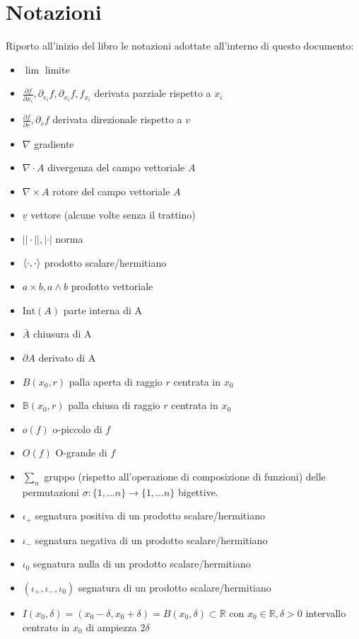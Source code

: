 \documentclass[openany, italian]{book}
\begin{document}
	\chapter*{Notazioni}
	Riporto all'inizio del libro le notazioni adottate all'interno di questo documento:
	\begin{itemize}[label=\hspace{-0.5em}]
		\item $\lim$ limite		
		\item $\frac{\partial f}{\partial x_i}, \partial_{e_i} f, \partial_{x_i} f, f_{x_i}$ derivata parziale rispetto a $x_i$
		\item $\frac{\partial f}{\partial v}, \partial_v f$ derivata direzionale rispetto a $v$
		\item $\nabla$ gradiente
		\item $\nabla \cdot A$ divergenza del campo vettoriale $A$
		\item $\nabla \times A$ rotore del campo vettoriale $A$
		\item $\underline{v}$ vettore (alcune volte senza il trattino)
		\item $||\cdot||, |\cdot|$ norma
		\item $\langle \cdot, \cdot \rangle$ prodotto scalare/hermitiano
		\item $a \times b, a \wedge b$ prodotto vettoriale
		\item $\text{Int}(A)$ parte interna di A
		\item $\bar{A}$ chiusura di A
		\item $\partial A$ derivato di A
		\item $B(x_0, r)$ palla aperta di raggio $r$ centrata in $x_0$
		\item $\mathbb{B}(x_0, r)$ palla chiusa di raggio $r$ centrata in $x_0$
		\item $o(f)$ o-piccolo di $f$
		\item $O(f)$ O-grande di $f$
		\item $\sum_{n}$ gruppo (rispetto all'operazione di composizione di funzioni) delle permutazioni $\sigma: \{1, \ldots n \} \to \{1, \ldots n \}$ bigettive.
		\item $\iota_+$ segnatura positiva di un prodotto scalare/hermitiano
		\item $\iota_-$ segnatura negativa di un prodotto scalare/hermitiano
		\item $\iota_0$ segnatura nulla di un prodotto scalare/hermitiano
		\item $(\iota_+, \iota_-, \iota_0)$ segnatura di un prodotto scalare/hermitiano
		\item $I(x_0, \delta) = (x_0 - \delta, x_0 + \delta) = B(x_0, \delta) \subset \mathbb{R}$ con $x_0 \in \mathbb{R}, \delta > 0$ intervallo centrato in $x_0$ di ampiezza $2\delta$
	\end{itemize}
	
	
	
	
	
	
	\begin{appendices}
		
	\end{appendices}
	
	
\end{document}
